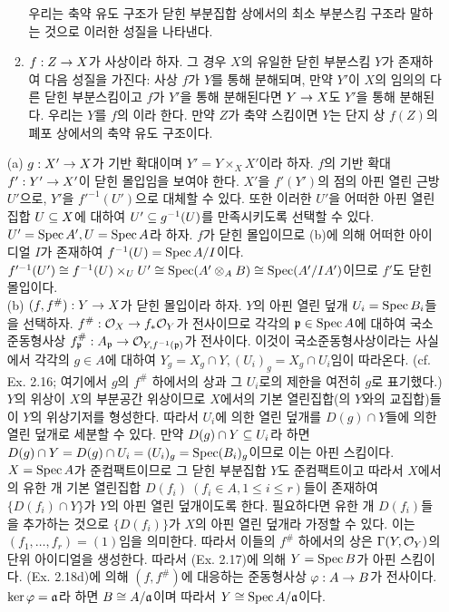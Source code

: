 \begin{enumerate}[label=\tb{3.\arabic*.},itemindent=0mm,itemsep=4mm]
\begin{enumerate}[label=(\alph*)]
	우리는 축약 유도 구조가 닫힌 부분집합 상에서의 최소 부분스킴 구조라 말하는 것으로 이러한 성질을 나타낸다.
	\item $f:Z\rightarrow X$가 사상이라 하자. 그 경우 $X$의 유일한 닫힌 부분스킴 $Y$가 존재하여 다음 성질을 가진다:
	사상 $f$가 $Y$를 통해 분해되며, 만약 $Y'$이 $X$의 임의의 다른 닫힌 부분스킴이고 $f$가 $Y'$을 통해 분해된다면
	$Y\rightarrow X$도 $Y'$을 통해 분해된다. 우리는 $Y$를 $f$의 이라 한다.
	만약 $Z$가 축약 스킴이면 $Y$는 단지 상 $f(Z)$의 폐포 상에서의 축약 유도 구조이다.
	\end{enumerate}
	\sol (a) $g:X'\rightarrow X$가 기반 확대이며 $Y'=Y\times_XX'$이라 하자. $f$의 기반 확대 $f':Y'\rightarrow X'$이 닫힌 몰입임을 보여야 한다.
	$X'$을 $f'(Y')$의 점의 아핀 열린 근방 $U'$으로, $Y'$을 $f'^{-1}(U')$으로 대체할 수 있다.
	또한 이러한 $U'$을 어떠한 아핀 열린집합 $U\subseteq X$에 대하여 $U'\subseteq g^{-1}(U)$를 만족시키도록 선택할 수 있다.
	$U'=\operatorname{Spec} A',U=\operatorname{Spec} A$라 하자. $f$가 닫힌 몰입이므로 (b)에 의해 어떠한 아이디얼 $I$가 존재하여 $f^{-1}(U)=\operatorname{Spec} A/I$이다.
	$f'^{-1}(U')\cong f^{-1}(U)\times_UU'\cong\operatorname{Spec}(A'\otimes_AB)\cong\operatorname{Spec}(A'/IA')$이므로 $f'$도 닫힌 몰입이다.\\
	(b) $(f,f^\#):Y\rightarrow X$가 닫힌 몰입이라 하자. $Y$의 아핀 열린 덮개 $U_i=\operatorname{Spec} B_i$들을 선택하자.
	$f^\#:\mathcal{O}_X\rightarrow f_*\mathcal{O}_Y$가 전사이므로 각각의 $\mathfrak{p}\in\operatorname{Spec} A$에 대하여
	국소준동형사상 $f^\#_{\mathfrak{p}}:A_{\mathfrak{p}}\rightarrow\mathcal{O}_{Y,f^{-1}(\mathfrak{p})}$가 전사이다.
	이것이 국소준동형사상이라는 사실에서 각각의 $g\in A$에 대하여 $Y_g=X_g\cap Y,(U_i)_g=X_g\cap U_i$임이 따라온다.
	(cf. Ex. 2.16; 여기에서 $g$의 $f^\#$ 하에서의 상과 그 $U_i$로의 제한을 여전히 $g$로 표기했다.)
	$Y$의 위상이 $X$의 부분공간 위상이므로 $X$에서의 기본 열린집합(의 $Y$와의 교집합)들이 $Y$의 위상기저를 형성한다.
	따라서 $U_i$에 의한 열린 덮개를 $D(g)\cap Y$들에 의한 열린 덮개로 세분할 수 있다.
	만약 $D(g)\cap Y\subseteq U_i$라 하면 $D(g)\cap Y=D(g)\cap U_i=(U_i)_g=\operatorname{Spec}(B_i)_g$이므로 이는 아핀 스킴이다.
	$X=\operatorname{Spec} A$가 준컴팩트이므로 그 닫힌 부분집합 $Y$도 준컴팩트이고
	따라서 $X$에서의 유한 개 기본 열린집합 $D(f_i)\:(f_i\in A,1\le i\le r)$들이 존재하여
	$\{D(f_i)\cap Y\}$가 $Y$의 아핀 열린 덮개이도록 한다.
	필요하다면 유한 개 $D(f_i)$들을 추가하는 것으로 $\{D(f_i)\}$가 $X$의 아핀 열린 덮개라 가정할 수 있다.
	이는 $(f_1,\ldots,f_r)=(1)$임을 의미한다. 따라서 이들의 $f^\#$ 하에서의 상은 $\Gamma(Y,\mathcal{O}_Y)$의 단위 아이디얼을 생성한다.
	따라서 (Ex. 2.17)에 의해 $Y=\operatorname{Spec} B$가 아핀 스킴이다. (Ex. 2.18d)에 의해 $(f,f^\#)$에 대응하는 준동형사상 $\varphi:A\rightarrow B$가 전사이다.
	$\ker\varphi=\mathfrak{a}$라 하면 $B\cong A/\mathfrak{a}$이며 따라서 $Y\cong\operatorname{Spec} A/\mathfrak{a}$이다.\\

\end{enumerate}
